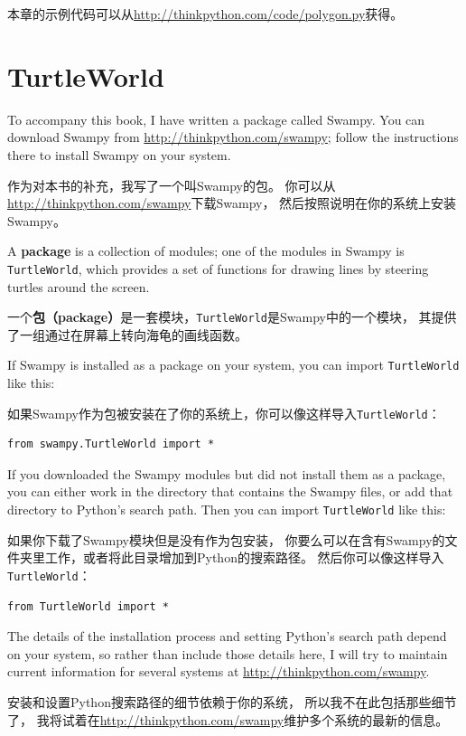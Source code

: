 \documentclass[10pt]{book}
\begin{document}
\begin{CJK}{UTF8}{gbsn}
本章的示例代码可以从\url{http://thinkpython.com/code/polygon.py}获得。

\section{TurtleWorld}

To accompany this book, I have written a package called Swampy.
You can download Swampy from \url{http://thinkpython.com/swampy};
follow the instructions there to install Swampy on your system.

作为对本书的补充，我写了一个叫Swampy的包。
你可以从\url{http://thinkpython.com/swampy}下载Swampy，
然后按照说明在你的系统上安装Swampy。

A {\bf package} is a collection of modules; one of the modules in
Swampy is {\tt TurtleWorld}, which provides a set of functions for
drawing lines by steering turtles around the screen.

一个{\bf 包（package）}是一套模块，{\tt TurtleWorld}是Swampy中的一个模块，
其提供了一组通过在屏幕上转向海龟的画线函数。
 
If Swampy is installed as a package on your system, you can import
{\tt TurtleWorld} like this:

如果Swampy作为包被安装在了你的系统上，你可以像这样导入{\tt TurtleWorld}：

\begin{verbatim}
from swampy.TurtleWorld import *
\end{verbatim}

If you downloaded the Swampy modules but did not install them as a
package, you can either work in the directory that contains the Swampy
files, or add that directory to Python's search path.  Then you can import
{\tt TurtleWorld} like this:

如果你下载了Swampy模块但是没有作为包安装，
你要么可以在含有Swampy的文件夹里工作，或者将此目录增加到Python的搜索路径。
然后你可以像这样导入{\tt TurtleWorld}：

\begin{verbatim}
from TurtleWorld import *
\end{verbatim}

The details of the installation process and setting Python's search
path depend on your system, so rather than include those details here,
I will try to maintain current information for several systems
at \url{http://thinkpython.com/swampy}.

安装和设置Python搜索路径的细节依赖于你的系统，
所以我不在此包括那些细节了，
我将试着在\url{http://thinkpython.com/swampy}维护多个系统的最新的信息。


\end{CJK}
\end{document}
